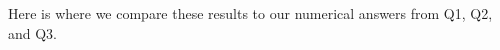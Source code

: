 \documentclass[10pt,a4paper]{article}
\begin{document}
Here is where we compare these results to our numerical answers from Q1, Q2, and Q3.
%
%
\end{document}
